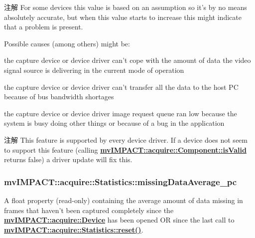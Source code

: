 \begin{DoxyNote}{注解}
For some devices this value is based on an assumption so it's by no means absolutely accurate, but when this value starts to increase this might indicate that a problem is present.
\end{DoxyNote}
Possible causes (among others) might be\+:
\begin{DoxyItemize}
\item the capture device or device driver can't cope with the amount of data the video signal source is delivering in the current mode of operation
\item the capture device or device driver can't transfer all the data to the host P\+C because of bus bandwidth shortages
\item the capture device or device driver image request queue ran low because the system is busy doing other things or because of a bug in the application
\end{DoxyItemize}

\begin{DoxyNote}{注解}
This feature is supported by every device driver. If a device does not seem to support this feature (calling {\bfseries \hyperlink{classmv_i_m_p_a_c_t_1_1acquire_1_1_component_ac51e55e7e046101f3c6119d84123abd5}{mv\+I\+M\+P\+A\+C\+T\+::acquire\+::\+Component\+::is\+Valid}} returns false) a driver update will fix this. 
\end{DoxyNote}
\hypertarget{classmv_i_m_p_a_c_t_1_1acquire_1_1_statistics_adb07566662f23c71c69465bab7b149e4}{
\subsubsection[{missing\+Data\+Average\+\_\+pc}]{ mv\+I\+M\+P\+A\+C\+T\+::acquire\+::\+Statistics\+::missing\+Data\+Average\+\_\+pc}}\label{classmv_i_m_p_a_c_t_1_1acquire_1_1_statistics_adb07566662f23c71c69465bab7b149e4}


A float property {\bfseries }(read-\/only) containing the average amount of data missing in frames that haven't been captured completely since the {\bfseries \hyperlink{classmv_i_m_p_a_c_t_1_1acquire_1_1_device}{mv\+I\+M\+P\+A\+C\+T\+::acquire\+::\+Device}} has been opened O\+R since the last call to {\bfseries \hyperlink{classmv_i_m_p_a_c_t_1_1acquire_1_1_statistics_adc21a9add6973f8f829f751e616b0a43}{mv\+I\+M\+P\+A\+C\+T\+::acquire\+::\+Statistics\+::reset()}}. 

